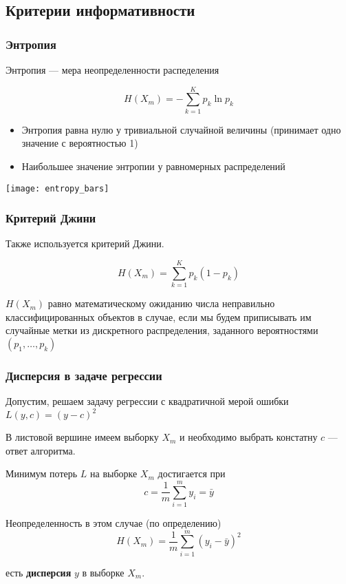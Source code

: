\documentclass{beamer}
\begin{document}
	\subsection{Критерии информативности}

	\begin{frame}
		\frametitle{Энтропия}

		Энтропия --- мера неопределенности распеделения

		\[
		H(X_m) = - \sum_{k=1}^{K} p_k \ln p_k
		\]

		\begin{itemize}
			\item Энтропия равна нулю у тривиальной случайной величины (принимает одно значение с вероятностью 1)
			\item Наибольшее значение энтропии у равномерных распределений
		\end{itemize}

		\texttt{[image: entropy\_bars]}
	\end{frame}

	\begin{frame}
		\frametitle{Критерий Джини}
		Также используется критерий Джини.

		\[
		H(X_m) = \sum_{k=1}^{K} p_k (1 - p_k)
		\]

		$H(X_m)$ равно математическому ожиданию числа неправильно классифицированных объектов в случае, 
		если мы будем приписывать им случайные метки из дискретного распределения, заданного вероятностями
		$(p_1, \dots, p_k)$
	\end{frame}

	\begin{frame}
		\frametitle{Дисперсия в задаче регрессии}
		
		Допустим, решаем задачу регрессии с квадратичной мерой ошибки $L(y, c) = (y - c)^2$

		\vspace{15pt}

		В листовой вершине имеем выборку $X_m$ и необходимо выбрать констатну $c$ --- ответ алгоритма.

		Минимум потерь $L$ на выборке $X_m$ достигается при 
		\[
		c = \frac{1}{m} \sum_{i=1}^{m} y_i = \bar{y}
		\]
		
		Неопределенность в этом случае (по определению)
		\[
		H(X_m) = \frac{1}{m} \sum_{i = 1}^{m} (y_i - \bar{y})^2
		\]

		есть \textbf{дисперсия} $y$ в выборке $X_m$.
	\end{frame}
\end{document}
